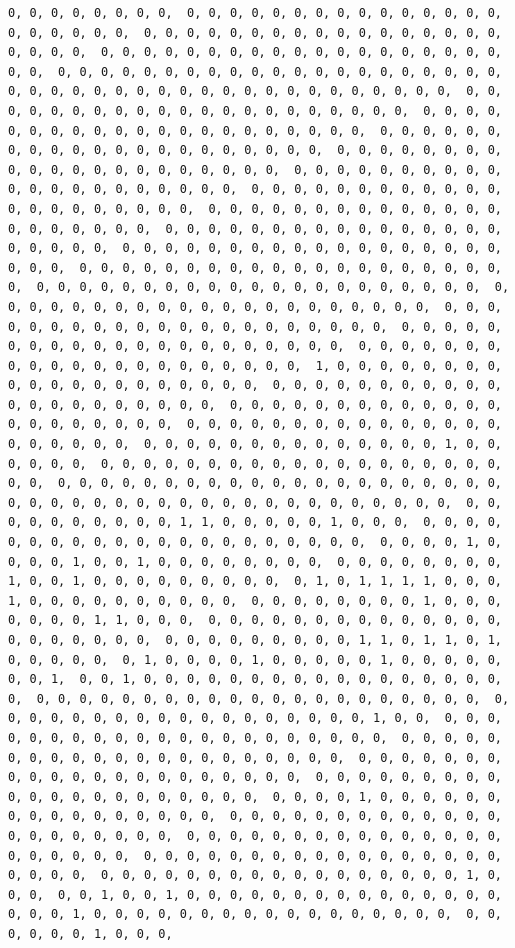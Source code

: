\documentclass[
]{article}
\begin{document}
\begin{verbatim}
0, 0, 0, 0, 0, 0, 0, 0,  0, 0, 0, 0, 0, 0, 0, 0, 0, 0, 0, 0, 0, 0, 0, 0, 0, 0, 0, 0, 0,  0, 0, 0, 0, 0, 0, 0, 0, 0, 0, 0, 0, 0, 0, 0, 0, 0, 0, 0, 0, 0,  0, 0, 0, 0, 0, 0, 0, 0, 0, 0, 0, 0, 0, 0, 0, 0, 0, 0, 0, 0, 0,  0, 0, 0, 0, 0, 0, 0, 0, 0, 0, 0, 0, 0, 0, 0, 0, 0, 0, 0, 0, 0,  0, 0, 0, 0, 0, 0, 0, 0, 0, 0, 0, 0, 0, 0, 0, 0, 0, 0, 0, 0, 0,  0, 0, 0, 0, 0, 0, 0, 0, 0, 0, 0, 0, 0, 0, 0, 0, 0, 0, 0, 0, 0,  0, 0, 0, 0, 0, 0, 0, 0, 0, 0, 0, 0, 0, 0, 0, 0, 0, 0, 0, 0, 0,  0, 0, 0, 0, 0, 0, 0, 0, 0, 0, 0, 0, 0, 0, 0, 0, 0, 0, 0, 0, 0,  0, 0, 0, 0, 0, 0, 0, 0, 0, 0, 0, 0, 0, 0, 0, 0, 0, 0, 0, 0, 0,  0, 0, 0, 0, 0, 0, 0, 0, 0, 0, 0, 0, 0, 0, 0, 0, 0, 0, 0, 0, 0,  0, 0, 0, 0, 0, 0, 0, 0, 0, 0, 0, 0, 0, 0, 0, 0, 0, 0, 0, 0, 0,  0, 0, 0, 0, 0, 0, 0, 0, 0, 0, 0, 0, 0, 0, 0, 0, 0, 0, 0, 0, 0,  0, 0, 0, 0, 0, 0, 0, 0, 0, 0, 0, 0, 0, 0, 0, 0, 0, 0, 0, 0, 0,  0, 0, 0, 0, 0, 0, 0, 0, 0, 0, 0, 0, 0, 0, 0, 0, 0, 0, 0, 0, 0,  0, 0, 0, 0, 0, 0, 0, 0, 0, 0, 0, 0, 0, 0, 0, 0, 0, 0, 0, 0, 0,  0, 0, 0, 0, 0, 0, 0, 0, 0, 0, 0, 0, 0, 0, 0, 0, 0, 0, 0, 0, 0,  0, 0, 0, 0, 0, 0, 0, 0, 0, 0, 0, 0, 0, 0, 0, 0, 0, 0, 0, 0, 0,  0, 0, 0, 0, 0, 0, 0, 0, 0, 0, 0, 0, 0, 0, 0, 0, 0, 0, 0, 0, 0,  0, 0, 0, 0, 0, 0, 0, 0, 0, 0, 0, 0, 0, 0, 0, 0, 0, 0, 0, 0, 0,  0, 0, 0, 0, 0, 0, 0, 0, 0, 0, 0, 0, 0, 0, 0, 0, 0, 0, 0, 0, 0,  1, 0, 0, 0, 0, 0, 0, 0, 0, 0, 0, 0, 0, 0, 0, 0, 0, 0, 0, 0, 0,  0, 0, 0, 0, 0, 0, 0, 0, 0, 0, 0, 0, 0, 0, 0, 0, 0, 0, 0, 0, 0,  0, 0, 0, 0, 0, 0, 0, 0, 0, 0, 0, 0, 0, 0, 0, 0, 0, 0, 0, 0, 0,  0, 0, 0, 0, 0, 0, 0, 0, 0, 0, 0, 0, 0, 0, 0, 0, 0, 0, 0, 0, 0,  0, 0, 0, 0, 0, 0, 0, 0, 0, 0, 0, 0, 0, 0, 1, 0, 0, 0, 0, 0, 0,  0, 0, 0, 0, 0, 0, 0, 0, 0, 0, 0, 0, 0, 0, 0, 0, 0, 0, 0, 0, 0,  0, 0, 0, 0, 0, 0, 0, 0, 0, 0, 0, 0, 0, 0, 0, 0, 0, 0, 0, 0, 0,  0, 0, 0, 0, 0, 0, 0, 0, 0, 0, 0, 0, 0, 0, 0, 0, 0, 0, 0, 0, 0,  0, 0, 0, 0, 0, 0, 0, 0, 0, 0, 1, 1, 0, 0, 0, 0, 0, 1, 0, 0, 0,  0, 0, 0, 0, 0, 0, 0, 0, 0, 0, 0, 0, 0, 0, 0, 0, 0, 0, 0, 0, 0,  0, 0, 0, 0, 1, 0, 0, 0, 0, 1, 0, 0, 1, 0, 0, 0, 0, 0, 0, 0, 0,  0, 0, 0, 0, 0, 0, 0, 0, 1, 0, 0, 1, 0, 0, 0, 0, 0, 0, 0, 0, 0,  0, 1, 0, 1, 1, 1, 1, 0, 0, 0, 1, 0, 0, 0, 0, 0, 0, 0, 0, 0, 0,  0, 0, 0, 0, 0, 0, 0, 0, 1, 0, 0, 0, 0, 0, 0, 0, 1, 1, 0, 0, 0,  0, 0, 0, 0, 0, 0, 0, 0, 0, 0, 0, 0, 0, 0, 0, 0, 0, 0, 0, 0, 0,  0, 0, 0, 0, 0, 0, 0, 0, 0, 1, 1, 0, 1, 1, 0, 1, 0, 0, 0, 0, 0,  0, 1, 0, 0, 0, 0, 1, 0, 0, 0, 0, 0, 1, 0, 0, 0, 0, 0, 0, 0, 1,  0, 0, 1, 0, 0, 0, 0, 0, 0, 0, 0, 0, 0, 0, 0, 0, 0, 0, 0, 0, 0,  0, 0, 0, 0, 0, 0, 0, 0, 0, 0, 0, 0, 0, 0, 0, 0, 0, 0, 0, 0, 0,  0, 0, 0, 0, 0, 0, 0, 0, 0, 0, 0, 0, 0, 0, 0, 0, 0, 0, 1, 0, 0,  0, 0, 0, 0, 0, 0, 0, 0, 0, 0, 0, 0, 0, 0, 0, 0, 0, 0, 0, 0, 0,  0, 0, 0, 0, 0, 0, 0, 0, 0, 0, 0, 0, 0, 0, 0, 0, 0, 0, 0, 0, 0,  0, 0, 0, 0, 0, 0, 0, 0, 0, 0, 0, 0, 0, 0, 0, 0, 0, 0, 0, 0, 0,  0, 0, 0, 0, 0, 0, 0, 0, 0, 0, 0, 0, 0, 0, 0, 0, 0, 0, 0, 0, 0,  0, 0, 0, 0, 1, 0, 0, 0, 0, 0, 0, 0, 0, 0, 0, 0, 0, 0, 0, 0, 0,  0, 0, 0, 0, 0, 0, 0, 0, 0, 0, 0, 0, 0, 0, 0, 0, 0, 0, 0, 0, 0,  0, 0, 0, 0, 0, 0, 0, 0, 0, 0, 0, 0, 0, 0, 0, 0, 0, 0, 0, 0, 0,  0, 0, 0, 0, 0, 0, 0, 0, 0, 0, 0, 0, 0, 0, 0, 0, 0, 0, 0, 0, 0,  0, 0, 0, 0, 0, 0, 0, 0, 0, 0, 0, 0, 0, 0, 0, 0, 0, 1, 0, 0, 0,  0, 0, 1, 0, 0, 1, 0, 0, 0, 0, 0, 0, 0, 0, 0, 0, 0, 0, 0, 0, 0,  0, 0, 0, 1, 0, 0, 0, 0, 0, 0, 0, 0, 0, 0, 0, 0, 0, 0, 0, 0, 0,  0, 0, 0, 0, 0, 0, 1, 0, 0, 0, 
\end{verbatim}
\end{document}
